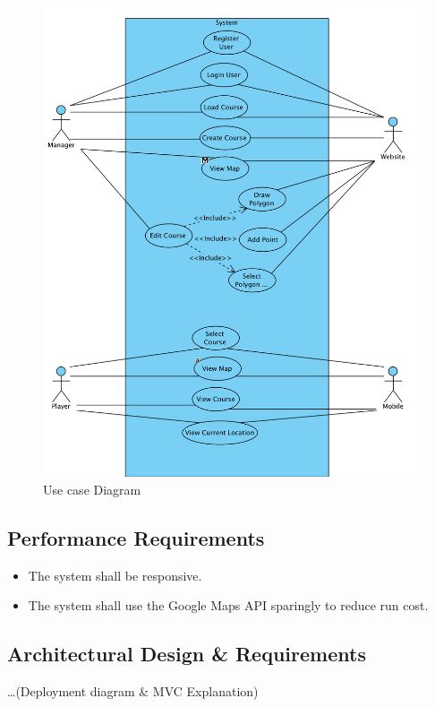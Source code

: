 \documentclass{article}
\begin{document}
    \begin{figure}[h]
    \centering
    \includegraphics[scale=0.6]{UsecaseDiagram}
    \caption{Use case Diagram}
    \label{fig:usecase1}
    \end{figure}

    \subsection{Performance Requirements}
    \begin{itemize}
        \item
            The system shall be responsive.
        \item
            The system shall use the Google Maps API sparingly to reduce run
            cost.
    \end{itemize}

    \subsection{Architectural Design \& Requirements}
    \ldots (Deployment diagram \& MVC Explanation)
\end{document}
